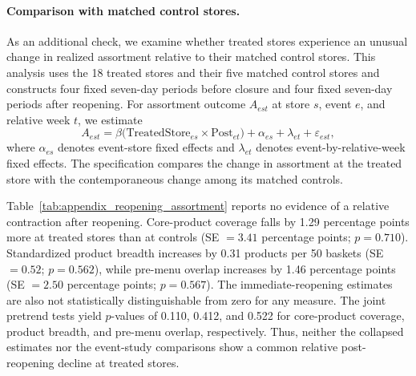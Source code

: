 \documentclass[11 pt]{article}
\begin{document}
\paragraph{Comparison with matched control stores.}
As an additional check, we examine whether treated stores experience an unusual change in realized assortment relative to their matched control stores. This analysis uses the 18 treated stores and their five matched control stores and constructs four fixed seven-day periods before closure and four fixed seven-day periods after reopening. For assortment outcome $A_{est}$ at store $s$, event $e$, and relative week $t$, we estimate
\begin{equation}
A_{est}
=
\beta\big(\text{TreatedStore}_{es}\times\text{Post}_{et}\big)
+\alpha_{es}
+\lambda_{et}
+\varepsilon_{est},
\label{eq:assortment_did}
\end{equation}
where $\alpha_{es}$ denotes event-store fixed effects and $\lambda_{et}$ denotes event-by-relative-week fixed effects. The specification compares the change in assortment at the treated store with the contemporaneous change among its matched controls.

Table~\ref{tab:appendix_reopening_assortment} reports no evidence of a relative contraction after reopening. Core-product coverage falls by 1.29 percentage points more at treated stores than at controls (SE $=3.41$ percentage points; $p=0.710$). Standardized product breadth increases by 0.31 products per 50 baskets (SE $=0.52$; $p=0.562$), while pre-menu overlap increases by 1.46 percentage points (SE $=2.50$ percentage points; $p=0.567$). The immediate-reopening estimates are also not statistically distinguishable from zero for any measure. The joint pretrend tests yield $p$-values of 0.110, 0.412, and 0.522 for core-product coverage, product breadth, and pre-menu overlap, respectively. Thus, neither the collapsed estimates nor the event-study comparisons show a common relative post-reopening decline at treated stores.
\end{document}
